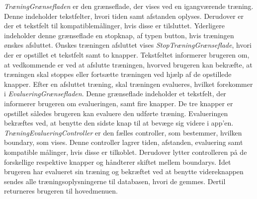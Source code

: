 \textit{TræningGrænsefladen} er den grænseflade, der vises ved en igangværende træning. Denne indeholder tekstfelter, hvori tiden samt afstanden oplyses. Derudover er der et tekstfelt til kompatiblemålinger, hvis disse er tilsluttet. Yderligere indeholder denne grænseflade en stopknap, af typen button, hvis træningen ønskes afsluttet. 
Ønskes træningen afsluttet vises \textit{StopTræningGrænseflade}, hvori der er opstillet et tekstfelt samt to knapper. Tekstfeltet informerer brugeren om, at vedkommende er ved at afslutte træningen, hvorved brugeren kan bekræfte, at træningen skal stoppes eller fortsætte træningen ved hjælp af de opstillede knapper. 
Efter en afsluttet træning, skal træningen evalueres, hvilket forekommer i \textit{EvalueringGrænsefladen}. Denne grænseflade indeholder et tekstfelt, der informerer brugeren om evalueringen, samt fire knapper. De tre knapper er opstillet således brugeren kan evaluere den udførte træning. Evalueringen bekræftes ved, at benytte den sidste knap til at bevæge sig videre i app’en. 
\textit{TræningEvalueringController} er den fælles controller, som bestemmer, hvilken boundary, som vises. Denne controller lagrer tiden, afstanden, evaluering samt kompatible målinger, hvis disse er tilkoblet. Derudover lytter controlleren på de forskellige respektive knapper og håndterer skiftet mellem boundarys. Idet brugeren har evalueret sin træning og bekræftet ved at benytte videreknappen sendes alle træningsoplysningerne til databasen, hvori de gemmes. Dertil returneres brugeren til hovedmenuen. 
